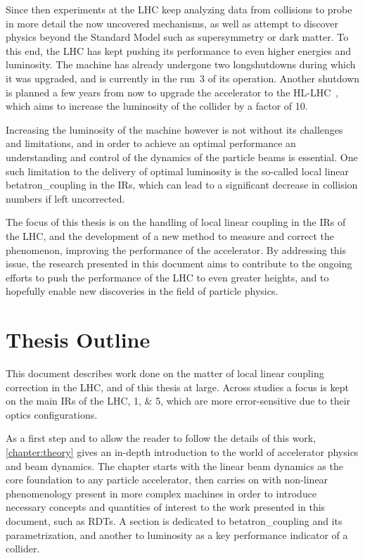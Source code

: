Since then experiments at the \gls{LHC} keep analyzing data from collisions to probe in more detail the now uncovered mechanisms, as well as attempt to discover physics beyond the Standard Model such as supersymmetry or dark matter.
To this end, the LHC has kept pushing its performance to even higher energies and \gls{luminosity}.
The machine has already undergone two \glspl{longshutdown} during which it was upgraded, and is currently in the \Gls{run}~\num{3} of its operation.
Another shutdown is planned a few years from now to upgrade the accelerator to the \gls{HL-LHC}~\cite{Website:HLLHC}, which aims to increase the \gls{luminosity} of the collider by a factor of \num{10}.

Increasing the luminosity of the machine however is not without its challenges and limitations, and in order to achieve an optimal performance an understanding and control of the dynamics of the particle beams is essential.
One such limitation to the delivery of optimal \gls{luminosity} is the so-called local linear \gls{betatron_coupling} in the \glspl{IR}, which can lead to a significant decrease in collision numbers if left uncorrected.

The focus of this thesis is on the handling of local linear coupling in the \glspl{IR} of the \gls{LHC}, and the development of a new method to measure and correct the phenomenon, improving the performance of the accelerator.
By addressing this issue, the research presented in this document aims to contribute to the ongoing efforts to push the performance of the \gls{LHC} to even greater heights, and to hopefully enable new discoveries in the field of particle physics.

\section{Thesis Outline}

This document describes work done on the matter of local linear coupling correction in the LHC, and of this thesis at large.
Across studies a focus is kept on the main \glspl{IR} of the \gls{LHC}, \numlist{1;5}, which are more error-sensitive due to their optics configurations.

As a first step and to allow the reader to follow the details of this work, \cref{chapter:theory} gives an in-depth introduction to the world of accelerator physics and beam dynamics.
The chapter starts with the linear beam dynamics as the core foundation to any particle accelerator, then carries on with non-linear phenomenology present in more complex machines in order to introduce necessary concepts and quantities of interest to the work presented in this document, such as \glspl{RDT}.
A section is dedicated to \gls{betatron_coupling} and its parametrization, and another to \gls{luminosity} as a key performance indicator of a collider.

